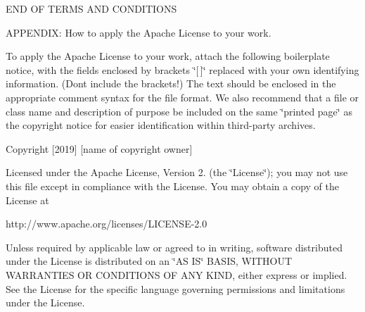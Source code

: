 END OF TERMS AND CONDITIONS

APPENDIX\+: How to apply the Apache License to your work.

To apply the Apache License to your work, attach the following boilerplate notice, with the fields enclosed by brackets \char`\"{}\mbox{[}$\,$\mbox{]}\char`\"{} replaced with your own identifying information. (Don\textquotesingle{}t include the brackets!) The text should be enclosed in the appropriate comment syntax for the file format. We also recommend that a file or class name and description of purpose be included on the same \char`\"{}printed page\char`\"{} as the copyright notice for easier identification within third-\/party archives.

Copyright \mbox{[}2019\mbox{]} \mbox{[}name of copyright owner\mbox{]}

Licensed under the Apache License, Version 2. (the \char`\"{}\+License\char`\"{}); you may not use this file except in compliance with the License. You may obtain a copy of the License at \begin{DoxyVerb}http://www.apache.org/licenses/LICENSE-2.0
\end{DoxyVerb}
 Unless required by applicable law or agreed to in writing, software distributed under the License is distributed on an \char`\"{}\+AS IS\char`\"{} BASIS, WITHOUT WARRANTIES OR CONDITIONS OF ANY KIND, either express or implied. See the License for the specific language governing permissions and limitations under the License. 